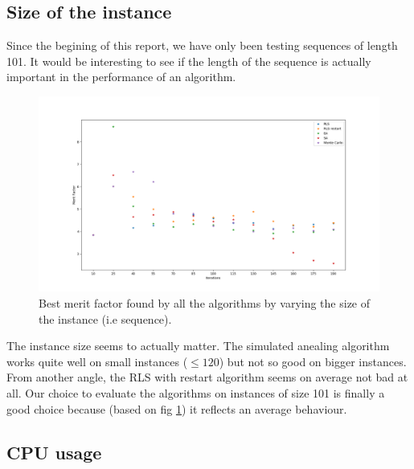 \documentclass[a4paper,11pt,openany]{article}
\begin{document}
\subsection{Size of the instance}
\noindent
Since the begining of this report, we have only been testing sequences of length 101. It would be interesting to see if the length of the sequence is actually important in the performance of an algorithm.
\begin{figure}[H]
\begin{center}
\includegraphics[scale=0.26]{Images/instance_size}
\caption{Best merit factor found by all the algorithms by varying the size of the instance (i.e sequence).}
\label{fig:instance_size}
\end{center}
\end{figure}
\noindent
The instance size seems to actually matter. The simulated anealing algorithm works quite well on small instances ($\leq 120$) but not so good on bigger instances. From another angle, the RLS with restart algorithm seems on average not bad at all. Our choice to evaluate the algorithms on instances of size 101 is finally a good choice because (based on fig \ref{fig:instance_size}) it reflects an average behaviour.
\subsection{CPU usage}
\end{document}
